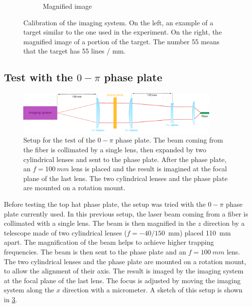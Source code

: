 \begin{figure}
\begin{subfigure}[b]{0.55\textwidth}
        \caption{Magnified image}
        \label{fig:magnified}
    \end{subfigure}
    \hfill
    \caption{Calibration of the imaging system. On the left, an example of a target similar to the one used in the experiment. On the right, the magnified image of a portion of the target. The number 55 means that the target has 55 lines / \si{mm}.}
\end{figure}

\subsection{Test with the $0-\pi$ phase plate}
\begin{figure}
    \centering
    \includegraphics[width=0.9\textwidth]{chapters/chapter_3/figures/0pi_setup.pdf}
    \caption{Setup for the test of the $0-\pi$ phase plate. The beam coming from the fiber is collimated by a single lens, then expanded by two cylindrical lenses and sent to the phase plate. After the phase plate, an $f=\SI{100}{mm}$ lens is placed and the result is imagined at the focal plane of the last lens. The two cylindrical lenses and the phase plate are mounted on a rotation mount.}
    \label{fig:0pi_setup}
\end{figure}

Before testing the top hat phase plate, the setup was tried with the $0-\pi$ phase plate currently used. In this previous setup, the laser beam coming from a fiber is collimated with a single lens. The beam is then magnified in the $z$ direction by a telescope made of two cylindrical lenses ($f=-40/150$~mm) placed \SI{110}{mm} apart. The magnification of the beam helps to achieve higher trapping frequencies. The beam is then sent to the phase plate and an $f=\SI{100}{mm}$ lens. The two cylindrical lenses and the phase plate are mounted on a rotation mount, to allow the alignment of their axis. The result is imaged by the imaging system at the focal plane of the last lens. The focus is adjusted by moving the imaging system along the $x$ direction with a micrometer. A sketch of this setup is shown in \cref{fig:0pi_setup}.

